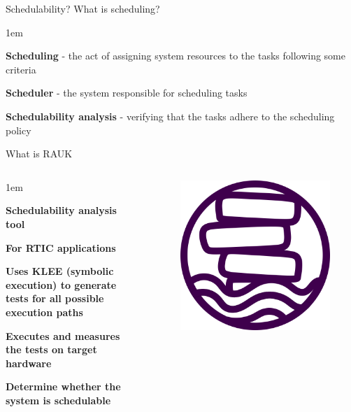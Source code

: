 \begin{frame}{Schedulability?}
    What is scheduling?
    \vspace{1em}
    \begin{itemize-size}{1em}
        \item \textbf{Scheduling} - the act of assigning system
        resources to the tasks following some criteria
    \item \textbf{Scheduler} - the system responsible for
        scheduling tasks
    \item \textbf{Schedulability analysis} - verifying that the tasks
        adhere to the scheduling policy
    \end{itemize-size}
\end{frame}

\begin{frame}{What is RAUK}
    \begin{columns}
        \begin{itemize-size}{1em}
            \item \textbf{Schedulability analysis tool}
            \item \textbf{For RTIC applications}
            \item \textbf{Uses KLEE (symbolic execution) to generate tests for
                all possible execution paths}
            \item \textbf{Executes and measures the tests on target hardware}
            \item \textbf{Determine whether the system is schedulable}
        \end{itemize-size}

        \begin{figure}
            \centering
            \includegraphics[scale=0.25]{pictures/RAUK.png}
        \end{figure}
    \end{columns}
\end{frame}
